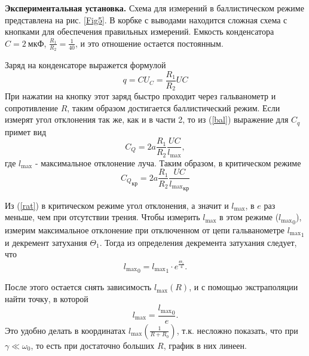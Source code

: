 \documentclass[12pt,a4paper]{article}
\begin{document}
\textbf{Экспериментальная установка.} Схема для измерений в баллистическом режиме представлена на рис. \ref{Fig5}. В корбке с выводами находится сложная схема с кнопками для обеспечения правильных измерений. Емкость конденсатора $C = 2~\text{мкФ}$, $\frac{R_1}{R_2} = \frac{1}{40}$, и это отношение остается постоянным.

Заряд на конденсаторе выражется формулой 
\begin{equation}
q = CU_C = \frac{R_1}{R_2}UC
\end{equation}
При нажатии на кнопку этот заряд быстро проходит через гальванометр и сопротивление $R$, таким образом достигается баллистический режим. Если измерят угол отклонения так же, как и в части 2, то из (\ref{bal}) выражение для $C_q$ примет вид
\begin{equation}
C_Q = 2a\frac{R_1}{R_2}\frac{UC}{l_\text{max}},
\end{equation}
где $l_\text{max}$ - максимальное отклонение луча. Таким образом, в критическом режиме
\begin{equation}
{C_Q}_\text{кр} = 2a\frac{R_1}{R_2}\frac{UC}{{l_\text{max}}_\text{кр}}\label{cqcr}
\end{equation}

Из (\ref{rat}) в критическом режиме угол отклонения, а значит и $l_\text{max}$, в $e$ раз меньше, чем при отсутствии трения. Чтобы измерить $l_\text{max}$ в этом режиме (${l_\text{max}}_0$), измерим максимальное отклонение при отключенном от цепи гальванометре ${l_\text{max}}_1$ и декремент затухания $\Theta_1$. Тогда из определения декремента затухания следует, что
\begin{equation}
{l_\text{max}}_0 = {l_\text{max}}_1\cdot e^{\frac{\Theta_1}{4}}.\label{lmax0}
\end{equation}

После этого остается снять зависимость $l_\text{max}(R)$, и с помощью экстраполяции найти точку, в которой
\begin{equation}
l_\text{max} = \frac{{l_\text{max}}_0}{e}.
\end{equation}
Это удобно делать в координатах $l_\text{max}\left(\frac{1}{R+R_0}\right)$, т.к. несложно показать, что при $\gamma \ll \omega_0$, то есть при достаточно больших $R$, график в них линеен.
\end{document}
